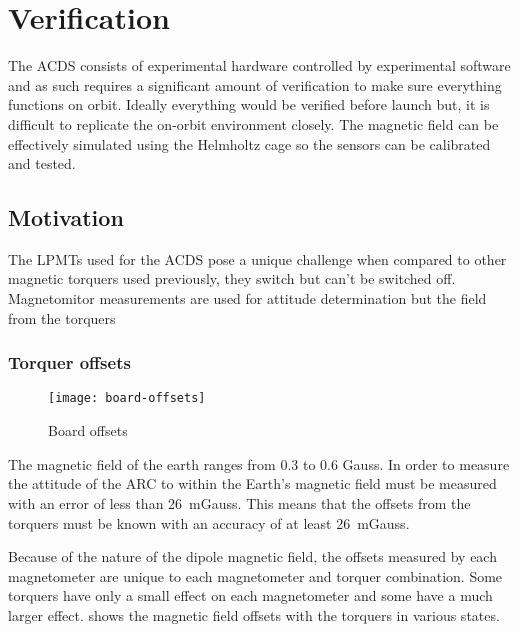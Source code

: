 
\chapter{Verification}

\label{ch:Verification}

The \ac{ACDS} consists of experimental hardware controlled by experimental software and as such requires a significant amount of verification to make sure everything functions on orbit. Ideally everything would be verified before launch but, it is difficult to replicate the on-orbit environment closely. The magnetic field can be effectively simulated using the Helmholtz cage so the sensors can be calibrated and tested. 

\section{Motivation}

The \acp{LPMT} used for the \ac{ACDS} pose a unique challenge when compared to other magnetic torquers used previously, they switch but can't be switched off. Magnetomitor measurements are used for attitude determination but the field from the torquers 

\subsection{Torquer offsets}

\begin{sidewaysfigure}
    \centering
    \texttt{[image: board-offsets]}
    \caption{Board offsets}
    \label{fig:b-offset}
\end{sidewaysfigure}


The magnetic field of the earth ranges from 0.3 to 0.6 Gauss\cite[pp.~114]{Wertz}. In order to measure the attitude of the \ac{ARC} to within {\textdegree} the Earth's magnetic field must be measured with an error of less than 26~mGauss. This means that the offsets from the torquers must be known with an accuracy of at least 26~mGauss. 

Because of the nature of the dipole magnetic field, the offsets measured by each magnetometer are unique to each magnetometer and torquer combination. Some torquers have only a small effect on each magnetometer and some have a much larger effect.  shows the magnetic field offsets with the torquers in various states. 

